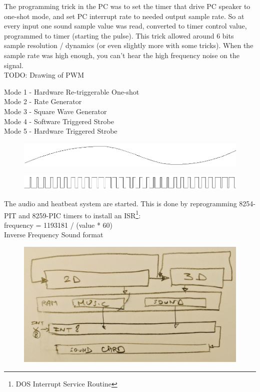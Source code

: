   \par
The programming trick in the PC was to set the timer that drive PC speaker to one-shot mode, and set PC interrupt rate to needed output sample rate. So at every input one sound sample value was read, converted to timer control value, programmed to timer (starting the pulse). This trick allowed around 6 bits sample resolution / dynamics (or even slightly more with some tricks). When the sample rate was high enough, you can’t hear the high frequency noise on the signal.\\
TODO: Drawing of PWM
\par
Mode 1 - Hardware Re-triggerable One-shot\\
Mode 2 - Rate Generator\\
Mode 3 - Square Wave Generator\\
Mode 4 - Software Triggered Strobe\\
Mode 5 - Hardware Triggered Strobe\\
\par
\begin{figure}[H]
\centering
 \includegraphics[width=\textwidth]{imgs/drawings/pwm/sinuois.png}
 \end{figure}
\par

\par
\begin{figure}[H]
\centering
 \includegraphics[width=\textwidth]{imgs/drawings/pwm/pwm_approximation.png}
 \end{figure}
\par


The audio and heatbeat system are started. This is done by reprogramming 8254-PIT and 8259-PIC timers to install an ISR\footnote{DOS Interrupt Service Routine}:\\

frequency = 1193181 / (value * 60)\\
Inverse Frequency Sound format\\
\par
\begin{figure}[H]
\centering
 \includegraphics[width=\textwidth]{imgs/drawings/three_blocks.png}
 \end{figure}

